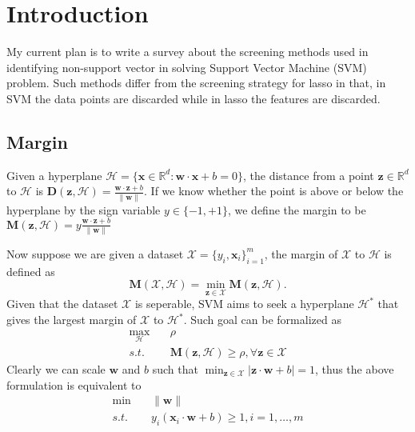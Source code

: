 \documentclass[
10pt, %
a4paper, %
oneside, %
headinclude,footinclude, %
BCOR5mm, %
]{scrartcl}
\newcommand{\DB}{\mathbf{D}}
\newcommand{\MB}{\mathbf{M}}
\newcommand{\wB}{\mathbf{w}}
\newcommand{\xB}{\mathbf{x}}
\newcommand{\zB}{\mathbf{z}}
\newcommand{\XM}{\mathcal{X}}
\newcommand{\HM}{\mathcal{H}}
\newcommand{\RBB}{\mathbb{R}}
\begin{document}
{\let\thefootnote\relax{}}

{\let\thefootnote\relax{}}


\newpage %


\section{Introduction}
My current plan is to write a survey about the screening methods used in identifying non-support vector in solving Support Vector Machine (SVM) problem.
Such methods differ from the screening strategy for lasso in that, in SVM the data points are discarded while in lasso the features are discarded.

\subsection{Margin}
Given a hyperplane $\HM = \{\xB \in \RBB^d: \wB\cdot\xB + b = 0\}$, the distance from a point $\zB \in \RBB^d$ to $\HM$ is $\DB(\zB, \HM) = \frac{\wB\cdot\zB+b}{\|\wB\|}$.
If we know whether the point is above or below the hyperplane by the sign variable $y \in \{-1, +1\}$, we define the margin to be $\MB(\zB, \HM) = y\frac{\wB\cdot\zB+b}{\|\wB\|}$

Now suppose we are given a dataset $\XM = \{y_i, \xB_i\}_{i=1}^m$, the margin of $\XM$ to $\HM$ is defined as
\begin{equation*}
	\MB(\XM, \HM) = \min_{\zB \in \XM} \MB(\zB, \HM).
\end{equation*}
Given that the dataset $\XM$ is seperable, SVM aims to seek a hyperplane $\HM^*$ that gives the largest margin of $\XM$ to $\HM^*$. Such goal can be formalized as 
\begin{equation*}
	\begin{aligned}
		\max_\HM & \quad \rho \\
		s.t. & \quad  \MB(\zB, \HM) \geq \rho, \forall \zB \in \XM
	\end{aligned}
\end{equation*}
Clearly we can scale $\wB$ and $b$ such that $\min_{\zB\in\XM} |\zB\cdot\wB+b|= 1$, thus the above formulation is equivalent to 
\begin{equation}
	\begin{aligned}
		\min & \quad \|\wB\| \\
		s.t. & \quad y_i(\xB_i\cdot\wB+b) \geq 1, i = 1, \ldots, m		
	\end{aligned}
\end{equation}
\end{document}
